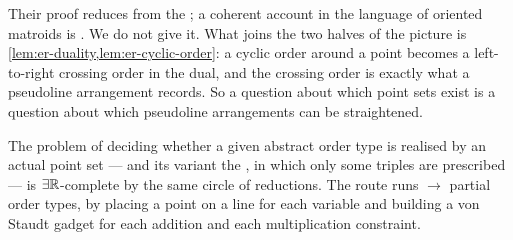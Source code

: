 Their proof reduces from the ; a coherent account in
the language of oriented matroids is \citet{BokowskiMockStreinu2001}. We do not
give it. What joins the two halves of the picture is
\cref{lem:er-duality,lem:er-cyclic-order}: a cyclic order around a point becomes
a left-to-right crossing order in the dual, and the crossing order is exactly
what a pseudoline arrangement records. So a question about which point sets
exist is a question about which pseudoline arrangements can be straightened.

The problem of deciding whether a given abstract order type is realised by an
actual point set --- and its variant the , in
which only some triples are prescribed --- is $\exists\mathbb{R}$-complete by the same
circle of reductions. The route runs  $\to$ partial order types,
by placing a point on a line for each variable and building a von Staudt gadget
for each addition and each multiplication constraint.
